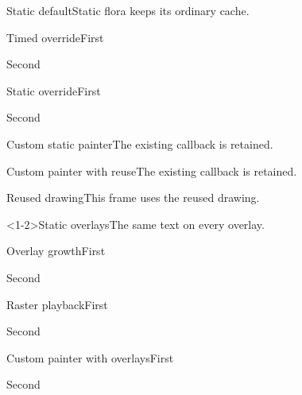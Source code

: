 \documentclass{beamer}
\begin{document}
\begin{frame}{Static default}Static flora keeps its ordinary cache.\end{frame}
\begin{frame}{Timed override}First\pause\par Second\end{frame}
\begin{frame}{Static override}First\pause\par Second\end{frame}
\begin{frame}{Custom static painter}The existing callback is retained.\end{frame}
\begin{frame}{Custom painter with reuse}The existing callback is retained.\end{frame}
\begin{frame}{Reused drawing}This frame uses the reused drawing.\end{frame}
\begin{frame}<1-2>{Static overlays}The same text on every overlay.\end{frame}
\begin{frame}{Overlay growth}First\pause\par Second\end{frame}
\begin{frame}{Raster playback}First\pause\par Second\end{frame}
\begin{frame}{Custom painter with overlays}First\pause\par Second\end{frame}
\end{document}
